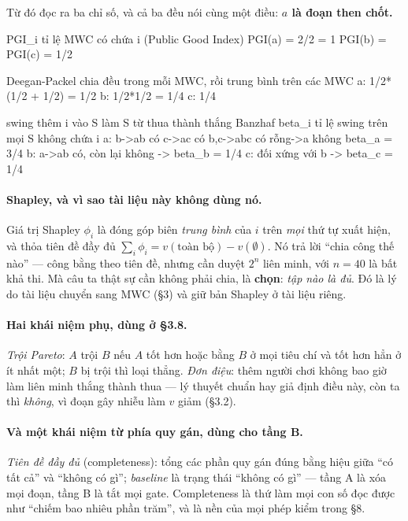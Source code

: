 \documentclass[11pt,a4paper]{article}
\begin{document}
Từ đó đọc ra ba chỉ số, và cả ba đều nói cùng một điều: \textbf{$a$ là đoạn then chốt.}

\begin{dia}
PGI_i          tỉ lệ MWC có chứa i          (Public Good Index)
   PGI(a) = 2/2 = 1      PGI(b) = PGI(c) = 1/2

Deegan-Packel  chia đều trong mỗi MWC, rồi trung bình trên các MWC
   a:  1/2*(1/2 + 1/2) = 1/2     b:  1/2*1/2 = 1/4     c:  1/4

swing          thêm i vào S làm S từ thua thành thắng
Banzhaf beta_i tỉ lệ swing trên mọi S không chứa i
   a:  {b}->{ab} có   {c}->{ac} có   {b,c}->{abc} có   rỗng->{a} không
       beta_a = 3/4
   b:  {a}->{ab} có,  còn lại không                ->  beta_b = 1/4
   c:  đối xứng với b                              ->  beta_c = 1/4
\end{dia}

\paragraph{Shapley, và vì sao tài liệu này không dùng nó.} Giá trị Shapley $\phi_i$ là đóng
góp biên \emph{trung bình} của $i$ trên \emph{mọi} thứ tự xuất hiện, và thỏa tiên đề đầy đủ
$\sum_i\phi_i=v(\text{toàn bộ})-v(\emptyset)$. Nó trả lời ``chia công thế nào'' --- công
bằng theo tiên đề, nhưng cần duyệt $2^n$ liên minh, với $n=40$ là bất khả thi. Mà câu ta
thật sự cần không phải chia, là \textbf{chọn}: \emph{tập nào là đủ}. Đó là lý do tài liệu
chuyển sang MWC (\S3) và giữ bản Shapley ở tài liệu riêng.

\paragraph{Hai khái niệm phụ, dùng ở \S3.8.} \emph{Trội Pareto}: $A$ trội $B$ nếu $A$ tốt
hơn hoặc bằng $B$ ở mọi tiêu chí và tốt hơn hẳn ở ít nhất một; $B$ bị trội thì loại thẳng.
\emph{Đơn điệu}: thêm người chơi không bao giờ làm liên minh thắng thành thua --- lý thuyết
chuẩn hay giả định điều này, còn ta thì \emph{không}, vì đoạn gây nhiễu làm $v$ giảm
(\S3.2).

\paragraph{Và một khái niệm từ phía quy gán, dùng cho tầng B.} \emph{Tiên đề đầy đủ}
(completeness): tổng các phần quy gán đúng bằng hiệu giữa ``có tất cả'' và ``không có gì'';
\emph{baseline} là trạng thái ``không có gì'' --- tầng A là xóa mọi đoạn, tầng B là tắt mọi
gate. Completeness là thứ làm mọi con số đọc được như ``chiếm bao nhiêu phần trăm'', và là
nền của mọi phép kiểm trong \S8.
\end{document}
